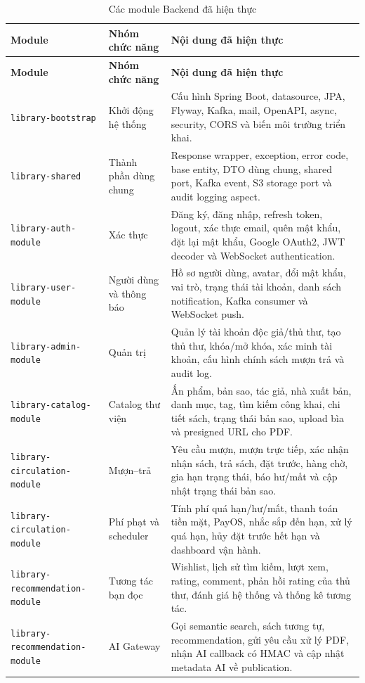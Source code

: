 \begin{longtable}{|p{3.8cm}|p{4cm}|p{6.5cm}|}
\caption{Các module Backend đã hiện thực}
\label{tab:be_modules_implemented}\\
\hline
\textbf{Module} & \textbf{Nhóm chức năng} & \textbf{Nội dung đã hiện thực} \\
\hline
\endfirsthead
\hline
\textbf{Module} & \textbf{Nhóm chức năng} & \textbf{Nội dung đã hiện thực} \\
\hline
\endhead
\texttt{library-bootstrap} & Khởi động hệ thống &
Cấu hình Spring Boot, datasource, JPA, Flyway, Kafka, mail, OpenAPI, async,
security, CORS và biến môi trường triển khai. \\
\hline
\texttt{library-shared} & Thành phần dùng chung &
Response wrapper, exception, error code, base entity, DTO dùng chung, shared
port, Kafka event, S3 storage port và audit logging aspect. \\
\hline
\texttt{library-auth-module} & Xác thực &
Đăng ký, đăng nhập, refresh token, logout, xác thực email, quên mật khẩu, đặt
lại mật khẩu, Google OAuth2, JWT decoder và WebSocket authentication. \\
\hline
\texttt{library-user-module} & Người dùng và thông báo &
Hồ sơ người dùng, avatar, đổi mật khẩu, vai trò, trạng thái tài khoản, danh sách
notification, Kafka consumer và WebSocket push. \\
\hline
\texttt{library-admin-module} & Quản trị &
Quản lý tài khoản độc giả/thủ thư, tạo thủ thư, khóa/mở khóa, xác minh tài
khoản, cấu hình chính sách mượn trả và audit log. \\
\hline
\texttt{library-catalog-module} & Catalog thư viện &
Ấn phẩm, bản sao, tác giả, nhà xuất bản, danh mục, tag, tìm kiếm công khai,
chi tiết sách, trạng thái bản sao, upload bìa và presigned URL cho PDF. \\
\hline
\texttt{library-circulation-module} & Mượn--trả &
Yêu cầu mượn, mượn trực tiếp, xác nhận nhận sách, trả sách, đặt trước, hàng chờ,
gia hạn trạng thái, báo hư/mất và cập nhật trạng thái bản sao. \\
\hline
\texttt{library-circulation-module} & Phí phạt và scheduler &
Tính phí quá hạn/hư/mất, thanh toán tiền mặt, PayOS, nhắc sắp đến hạn, xử lý quá
hạn, hủy đặt trước hết hạn và dashboard vận hành. \\
\hline
\texttt{library-recommendation-module} & Tương tác bạn đọc &
Wishlist, lịch sử tìm kiếm, lượt xem, rating, comment, phản hồi rating của thủ
thư, đánh giá hệ thống và thống kê tương tác. \\
\hline
\texttt{library-recommendation-module} & AI Gateway &
Gọi semantic search, sách tương tự, recommendation, gửi yêu cầu xử lý PDF, nhận
AI callback có HMAC và cập nhật metadata AI về publication. \\
\hline
\end{longtable}

